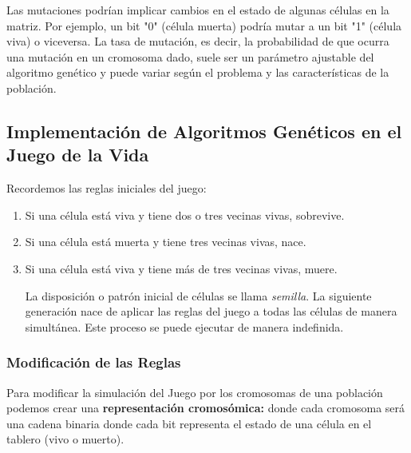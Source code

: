 Las mutaciones podrían implicar cambios en el estado de algunas células en la matriz. Por ejemplo, un bit "0" (célula muerta) podría mutar a un bit "1" (célula viva) o viceversa. La tasa de mutación, es decir, la probabilidad de que ocurra una mutación en un cromosoma dado, suele ser un parámetro ajustable del algoritmo genético y puede variar según el problema y las características de la población.



\subsection{Implementación de Algoritmos Genéticos en el Juego de la Vida}

Recordemos las reglas iniciales del juego:
\begin{enumerate}
    \item Si una célula está viva y tiene dos o tres vecinas vivas, sobrevive.
    \item Si una célula está muerta y tiene tres vecinas vivas, nace.
    \item Si una célula está viva y tiene más de tres vecinas vivas, muere.
    
    La disposición o patrón inicial de células se llama \textit{semilla}. La siguiente 
    generación nace de aplicar las reglas del juego a todas las células de manera 
    simultánea. Este proceso se puede ejecutar de manera indefinida.
\end{enumerate}

\subsubsection*{Modificación de las Reglas}

Para modificar la simulación del Juego por los cromosomas de una población podemos crear
una \textbf{representación cromosómica:} donde cada cromosoma será una cadena binaria 
donde cada bit representa el estado de una célula en el tablero (vivo o muerto).\\ 


